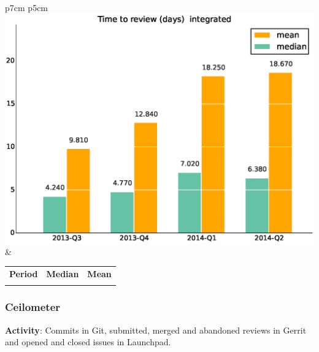 \documentclass[a4wide,11pt]{report}
\begin{document}
\begin{tabular}{p{7cm} p{5cm}}
    \vspace{0pt} 
    \includegraphics[scale=.35]{figs/timetoreview_medianintegrated.eps}
    & 
    \vspace{0pt}
    \begin{tabular}{l|r|r|}%
    \bfseries Period & \bfseries Median & \bfseries Mean %
    \csvreader[head to column names]{data/timetoreview_medianintegrated.csv}{}%
    {\\ & \mediantime & \meantime}
    \end{tabular}
\end{tabular}

\newpage 
 \subsubsection{Ceilometer}

\textbf{Activity}: Commits in Git, submitted, merged and abandoned reviews in Gerrit and opened and closed issues in Launchpad.
\end{document}

